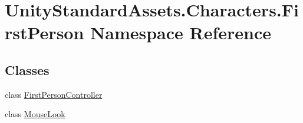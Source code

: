 \hypertarget{namespace_unity_standard_assets_1_1_characters_1_1_first_person}{}\section{Unity\+Standard\+Assets.\+Characters.\+First\+Person Namespace Reference}
\label{namespace_unity_standard_assets_1_1_characters_1_1_first_person}
\subsection*{Classes}
\begin{DoxyCompactItemize}
\item 
class \hyperlink{class_unity_standard_assets_1_1_characters_1_1_first_person_1_1_first_person_controller}{First\+Person\+Controller}
\item 
class \hyperlink{class_unity_standard_assets_1_1_characters_1_1_first_person_1_1_mouse_look}{Mouse\+Look}
\end{DoxyCompactItemize}
